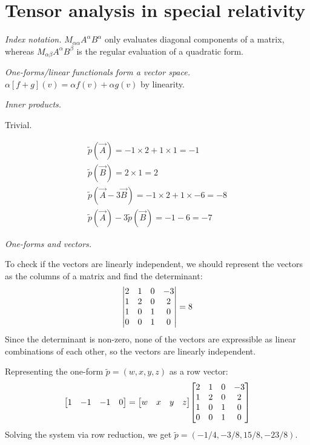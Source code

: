 \documentclass{report}
\begin{document}
\chapter{Tensor analysis in special relativity}

\begin{subquests}
	\item \emph{Index notation.}
	$M_{\alpha\alpha}A^{\alpha}B^{\alpha}$ only evaluates diagonal components of a matrix, whereas $M_{\alpha\beta}A^{\alpha}B^{\beta}$ is the regular evaluation of a quadratic form.

	\item \emph{One-forms/linear functionals form a vector space.} $\alpha [f + g](v) = \alpha f(v) + \alpha g(v)$ by linearity.

	\item \emph{Inner products.}
	\begin{subquests}
		\item Trivial.

		\item
		\begin{gather*}
			\tilde{p}(\vec A) = -1 \times 2 + 1 \times 1 = -1 \\
			\tilde{p}(\vec B) = 2 \times 1 = 2 \\
			\tilde{p}(\vec A - 3 \vec B) = -1 \times 2 + 1 \times -6 = -8 \\
			\tilde{p}(\vec A) - 3\tilde{p}(\vec B) = -1 - 6 = -7
		\end{gather*}
	\end{subquests}

	\item \emph{One-forms and vectors.}
	\begin{subquests}
		\item
		To check if the vectors are linearly independent, we should represent the vectors as the columns of a matrix and find the determinant:
		\begin{gather*}
			\mqty|
				2 & 1 & 0 & -3 \\
				1 & 2 & 0 & 2 \\
				1 & 0 & 1 & 0 \\
				0 & 0 & 1 & 0
			|
			= 8
		\end{gather*}
		Since the determinant is non-zero, none of the vectors are expressible as linear combinations of each other, so the vectors are linearly independent.

		\item
		Representing the one-form $\tilde p = (w, x, y, z)$ as a row vector:
		\begin{gather*}
			\mqty[
				1 & -1 & -1 & 0
			]
			=
			\mqty[
				w & x & y & z
			]
			\mqty[
				2 & 1 & 0 & -3 \\
				1 & 2 & 0 & 2 \\
				1 & 0 & 1 & 0 \\
				0 & 0 & 1 & 0
			]
		\end{gather*}
		Solving the system via row reduction, we get $\tilde p = (-1/4, -3/8, 15/8, -23/8)$.


\end{subquests}
\end{subquests}
\end{document}
